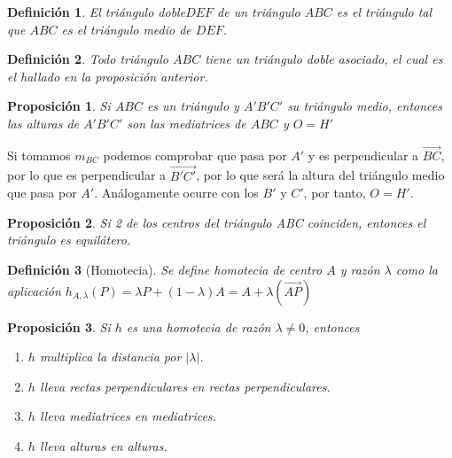 \documentclass[11pt, a4paper]{article}
\makeatletter
\newif\IfInSansMode
\let\oldsf\sffamily
\renewcommand*{\sffamily}{\oldsf\mathversion{sans}\InSansModetrue}
\let\oldnorm\normalfont
\renewcommand*{\normalfont}{\oldnorm\InSansModefalse\mathversion{normal}}
\renewenvironment{proof}[1][\proofname] {\vspace{-15pt}\par\pushQED{\qed}\normalfont\topsep6\p@\@plus6\p@\relax\trivlist\item[\hskip\labelsep\it#1\@addpunct{.}]\ignorespaces}{\popQED\endtrivlist\@endpefalse}
\renewcommand{\vec}{\overrightarrow}
\renewenvironment{proof}[1][\proofname] {\par\pushQED{\qed}\normalfont\topsep6\p@\@plus6\p@\relax\trivlist\item[\hskip\labelsep\itshape\sffamily#1\@addpunct{.}]\ignorespaces}{\popQED\endtrivlist\@endpefalse}
\theoremstyle{theorem-style}
\newtheorem{nprop}{Proposición}[section]
\theoremstyle{definition-style}
\newtheorem{ndef}{Definición}[section]
\theoremstyle{remark-style}
\theoremstyle{example-style}
\makeatother
\begin{document}
\begin{ndef}
  El triángulo doble$DEF$ de un triángulo $ABC$ es el triángulo tal que $ABC$ es el triángulo medio de $DEF$.
\end{ndef}

\begin{ndef}
  Todo triángulo $ABC$ tiene un triángulo doble asociado, el cual es el hallado en la proposición anterior.
\end{ndef}


\begin{nprop}
  Si $ABC$ es un triángulo y $A'B'C'$ su triángulo medio, entonces las alturas de $A'B'C'$ son las mediatrices de $ABC$ y $O=H'$
\end{nprop}
\begin{proof}
  Si tomamos $m_{BC}$ podemos comprobar que pasa por $A'$ y es perpendicular a $\vec{BC}$, por lo que es perpendicular a $\vec{B'C'}$, por lo que será la altura del triángulo medio que pasa por $A'$. Análogamente ocurre con los $B'$ y $C'$, por tanto, $O=H'$.
\end{proof}


\begin{nprop}Si 2 de los centros del triángulo ABC coinciden, entonces el triángulo es equilátero.
\end{nprop}


\begin{ndef}[Homotecia]
  Se define homotecia de centro $A$ y razón $\lambda$ como la aplicación $h_{A,\lambda}(P) = \lambda P + (1-\lambda)A = A+\lambda(\vec{AP})$
\end{ndef}

\begin{nprop} Si $h$ es una homotecia de razón $\lambda\ne 0$, entonces 
\begin{enumerate}
\item $h$ multiplica la distancia por $|\lambda|$.
\item $h$ lleva rectas perpendiculares en rectas perpendiculares.
\item $h$ lleva mediatrices en mediatrices.
\item $h$ lleva alturas en alturas.
\end{enumerate}
\end{nprop}
\end{document}
